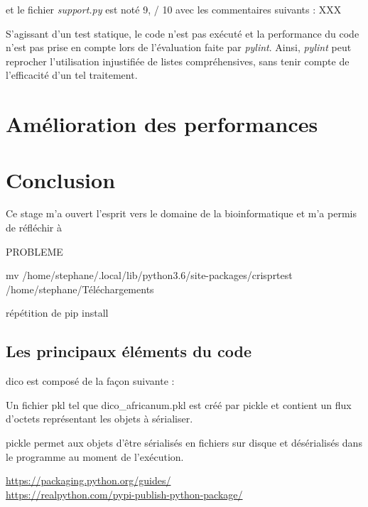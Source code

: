\documentclass[twoside,a4paper,11pt,frenchb,openany]{report}
\begin{document}
et le fichier \textit{support.py} est noté 9, / 10 avec les commentaires suivants :
XXX

S'agissant d'un test statique, le code n'est pas exécuté et la performance du code n'est pas prise en compte lors de l'évaluation faite par \textit{pylint}. Ainsi, \textit{pylint} peut reprocher l'utilisation injustifiée de listes compréhensives, sans tenir compte de l'efficacité d'un tel traitement.



\chapter{Amélioration des performances}


\chapter*{Conclusion}

Ce stage m'a ouvert l'esprit vers le domaine de la bioinformatique et m'a permis de réfléchir à 

	
	
PROBLEME

mv /home/stephane/.local/lib/python3.6/site-packages/crisprtest /home/stephane/Téléchargements

répétition de pip install
	


\section{Les principaux éléments du code}

dico est composé de la façon suivante :

Un fichier pkl tel que dico\_africanum.pkl est créé par pickle et contient un flux d'octets représentant les objets à sérialiser.

pickle permet aux objets d'être sérialisés en fichiers sur disque et désérialisés dans le programme au moment de l'exécution.
	
	\begin{spacing}{0.5}
		
		\renewcommand{\bibname}{Références}
		\begin{thebibliography}{10}
			\href{https://packaging.python.org/guides/}{https://packaging.python.org/guides/}\\

\href{https://realpython.com/pypi-publish-python-package/}{https://realpython.com/pypi-publish-python-package/}
			
		\end{thebibliography}
	\end{spacing}



\printindex
\end{document}
